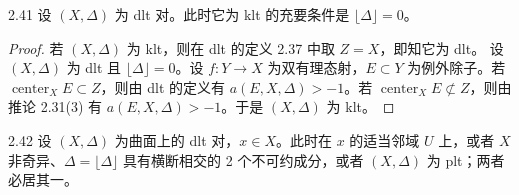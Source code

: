 \begin{propositionp}{2.41}
设 $(X,\Delta)$ 为 dlt 对。此时它为 klt 的充要条件是 $\lfloor\Delta\rfloor=0$。
\end{propositionp}
\begin{proof}
若 $(X,\Delta)$ 为 klt，则在 dlt 的定义 2.37 中取 $Z=X$，即知它为 dlt。
设 $(X,\Delta)$ 为 dlt 且 $\lfloor\Delta\rfloor=0$。设 $f\colon Y\to X$ 为双有理态射，$E\subset Y$ 为例外除子。若 $\operatorname{center}_XE\subset Z$，则由 dlt 的定义有 $a(E,X,\Delta)>-1$。若 $\operatorname{center}_XE\not\subset Z$，则由推论 2.31(3) 有 $a(E,X,\Delta)>-1$。于是 $(X,\Delta)$ 为 klt。
\end{proof}

\begin{propositionp}{2.42}
设 $(X,\Delta)$ 为曲面上的 dlt 对，$x\in X$。此时在 $x$ 的适当邻域 $U$ 上，或者 $X$ 非奇异、$\Delta=\lfloor\Delta\rfloor$ 具有横断相交的 2 个不可约成分，或者 $(X,\Delta)$ 为 plt；两者必居其一。
\end{propositionp}
